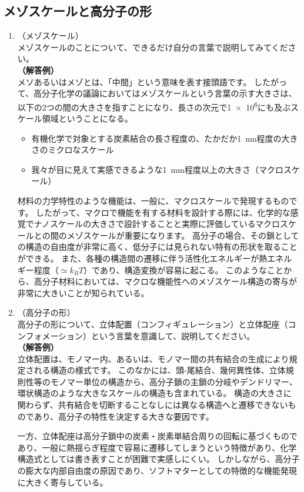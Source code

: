 \documentclass[a4paper,11pt]{jlreq}
\begin{document}
\subsection{メゾスケールと高分子の形}
\begin{enumerate}
\item （メゾスケール）\\メゾスケールのことについて、できるだけ自分の言葉で説明してみてください。\\
		\textbf{（解答例）}\\メソあるいはメゾとは、「中間」という意味を表す接頭語です。
		したがって、高分子化学の議論においてはメゾスケールという言葉の示す大きさは、以下の2つの間の大きさを指すことになり、長さの次元で\num{1e6}にも及ぶスケール領域ということになる。
        \begin{itemize}
            \item 有機化学で対象とする炭素結合の長さ程度の、たかだか\qty{1}{nm}程度の大きさのミクロなスケール
            \item 我々が目に見えて実感できるような\qty{1}{mm}程度以上の大きさ（マクロスケール）
        \end{itemize}
		材料の力学特性のような機能は、一般に、マクロスケールで発現するものです。
        したがって、マクロで機能を有する材料を設計する際には、化学的な感覚でナノスケールの大きさで設計することと実際に評価しているマクロスケールとの間のメゾスケールが重要になります。
		高分子の場合、その鎖としての構造の自由度が非常に高く、低分子には見られない特有の形状を取ることができる。
		また、各種の構造間の遷移に伴う活性化エネルギーが熱エネルギー程度（$\simeq k_B T$）であり、構造変換が容易に起こる。
		このようなことから、高分子材料においては、マクロな機能性へのメゾスケール構造の寄与が非常に大きいことが知られている。

\item （高分子の形）\\高分子の形について、立体配置（コンフィギュレーション）と立体配座（コンフォメーション）という言葉を意識して、説明してください。\\
		\textbf{（解答例）}\\立体配置は、モノマー内、あるいは、モノマー間の共有結合の生成により規定される構造の様式です。
        このなかには、頭-尾結合、幾何異性体、立体規則性等のモノマー単位の構造から、高分子鎖の主鎖の分岐やデンドリマー、環状構造のような大きなスケールの構造も含まれている。
		構造の大きさに関わらず、共有結合を切断することなしには異なる構造へと遷移できないものであり、高分子の特性を決定する大きな要因です。

		一方、立体配座は高分子鎖中の炭素・炭素単結合周りの回転に基づくものであり、一般に熱揺らぎ程度で容易に遷移してしまうという特徴があり、化学構造式としては書き表すことが困難で実感しにくい。
		しかしながら、高分子の膨大な内部自由度の原因であり、ソフトマターとしての特徴的な機能発現に大きく寄与している。

\end{enumerate}
\end{document}
